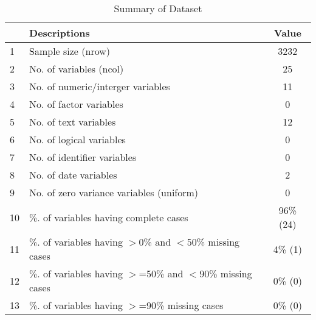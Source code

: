 \begin{table}[ht]
\centering
\caption{Summary of Dataset} 
\begin{tabular}{llc}
  \hline
 & Descriptions & Value \\ 
  \hline
1 & Sample size (nrow) & 3232 \\ 
  2 & No. of variables (ncol) & 25 \\ 
  3 & No. of numeric/interger variables & 11 \\ 
  4 & No. of factor variables & 0 \\ 
  5 & No. of text variables & 12 \\ 
  6 & No. of logical variables & 0 \\ 
  7 & No. of identifier variables & 0 \\ 
  8 & No. of date variables & 2 \\ 
  9 & No. of zero variance variables (uniform) & 0 \\ 
  10 & \%. of variables having complete cases & 96\% (24) \\ 
  11 & \%. of variables having $>$0\% and $<$50\% missing cases & 4\% (1) \\ 
  12 & \%. of variables having $>$=50\% and $<$90\% missing cases & 0\% (0) \\ 
  13 & \%. of variables having $>$=90\% missing cases & 0\% (0) \\ 
   \hline
\end{tabular}
\end{table}
